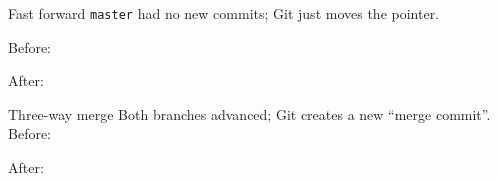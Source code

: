 \documentclass[11pt]{beamer}
\begin{document}
\begin{frame}[fragile]{Fast forward}
   \texttt{master} had no new commits;
   Git just moves the pointer.
   \vfill

   Before:
  \begin{flushleft}
  \end{flushleft}

  After:
  \begin{flushleft}
  \end{flushleft}
\end{frame}

\begin{frame}[fragile]{Three-way merge}
  Both branches advanced;
    Git creates a new ``merge commit''.
    \vfill
    Before: 
  \begin{flushleft}
  \end{flushleft}

  After:
  \begin{flushleft}
  \end{flushleft}
\end{frame}
\end{document}
